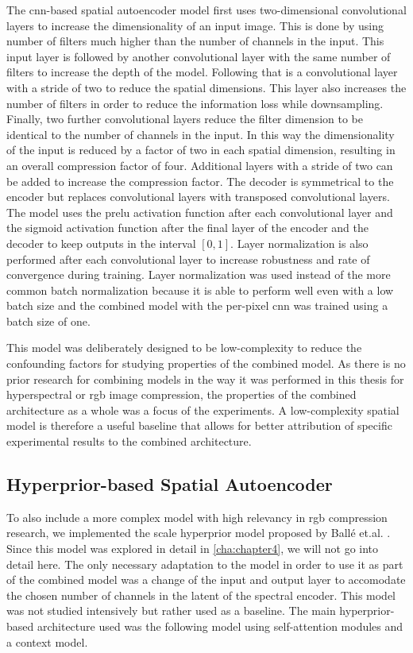 The \ac{cnn}-based spatial autoencoder model first uses two-dimensional convolutional layers to increase the dimensionality of an input image. This is done by using number of filters much higher than the number of channels in the input. This input layer is followed by another convolutional layer with the same number of filters to increase the depth of the model. Following that is a convolutional layer with a stride of two to reduce the spatial dimensions. This layer also increases the number of filters in order to reduce the information loss while downsampling. Finally, two further convolutional layers reduce the filter dimension to be identical to the number of channels in the input. In this way the dimensionality of the input is reduced by a factor of two in each spatial dimension, resulting in an overall compression factor of four. Additional layers with a stride of two can be added to increase the compression factor. The decoder is symmetrical to the encoder but replaces convolutional layers with transposed convolutional layers. The model uses the \ac{prelu} activation function after each convolutional layer and the sigmoid activation function after the final layer of the encoder and the decoder to keep outputs in the interval $[0,1]$. Layer normalization \citep{ba_layer_2016} is also performed after each convolutional layer to increase robustness and rate of convergence during training. Layer normalization was used instead of the more common batch normalization because it is able to perform well even with a low batch size and the combined model with the per-pixel \ac{cnn} was trained using a batch size of one.

This model was deliberately designed to be low-complexity to reduce the confounding factors for studying properties of the combined model. As there is no prior research for combining models in the way it was performed in this thesis for hyperspectral or \ac{rgb} image compression, the properties of the combined architecture as a whole was a focus of the experiments. A low-complexity spatial model is therefore a useful baseline that allows for better attribution of specific experimental results to the combined architecture.
\subsection{Hyperprior-based Spatial Autoencoder}
To also include a more complex model with high relevancy in \ac{rgb} compression research, we implemented the scale hyperprior model proposed by Ballé et.al. \citep{balle_end--end_2017}. Since this model was explored in detail in \autoref{cha:chapter4}, we will not go into detail here. The only necessary adaptation to the model in order to use it as part of the combined model was a change of the input and output layer to accomodate the chosen number of channels in the latent of the spectral encoder. This model was not studied intensively but rather used as a baseline. The main hyperprior-based architecture used was the following model using self-attention modules and a context model.
